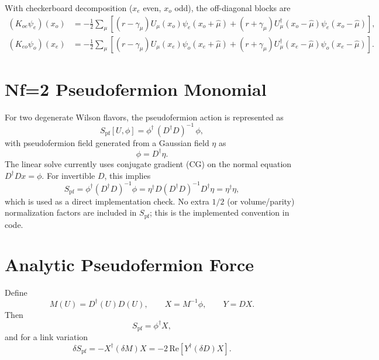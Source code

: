 \documentclass[11pt]{article}
\begin{document}
With checkerboard decomposition ($x_e$ even, $x_o$ odd), the off-diagonal blocks are
\begin{align}
(K_{oe}\psi_e)(x_o)
&=
-\frac{1}{2}\sum_\mu\left[(r-\gamma_\mu)U_\mu(x_o)\psi_e(x_o+\hat\mu)
+(r+\gamma_\mu)U_\mu^\dagger(x_o-\hat\mu)\psi_e(x_o-\hat\mu)\right],\\
(K_{eo}\psi_o)(x_e)
&=
-\frac{1}{2}\sum_\mu\left[(r-\gamma_\mu)U_\mu(x_e)\psi_o(x_e+\hat\mu)
+(r+\gamma_\mu)U_\mu^\dagger(x_e-\hat\mu)\psi_o(x_e-\hat\mu)\right].
\end{align}

\section{Nf=2 Pseudofermion Monomial}
For two degenerate Wilson flavors, the pseudofermion action is represented as
\begin{equation}
S_{\mathrm{pf}}[U,\phi] = \phi^\dagger\,(D^\dagger D)^{-1}\,\phi,
\end{equation}
with pseudofermion field generated from a Gaussian field $\eta$ as
\begin{equation}
\phi = D^\dagger \eta.
\end{equation}
The linear solve currently uses conjugate gradient (CG) on the normal equation
$D^\dagger D x = \phi$.
For invertible $D$, this implies
\begin{equation}
S_{\mathrm{pf}} = \phi^\dagger (D^\dagger D)^{-1}\phi
= \eta^\dagger D (D^\dagger D)^{-1} D^\dagger \eta
= \eta^\dagger \eta,
\end{equation}
which is used as a direct implementation check.
No extra $1/2$ (or volume/parity) normalization factors are included in
$S_{\mathrm{pf}}$; this is the implemented convention in code.

\section{Analytic Pseudofermion Force}
Define
\begin{equation}
M(U)=D^\dagger(U)D(U), \qquad
X = M^{-1}\phi, \qquad
Y = D X.
\end{equation}
Then
\begin{equation}
S_{\mathrm{pf}} = \phi^\dagger X,
\end{equation}
and for a link variation
\begin{equation}
\delta S_{\mathrm{pf}}
= - X^\dagger (\delta M) X
= -2\,\mathrm{Re}\!\left[Y^\dagger (\delta D) X\right].
\end{equation}
\end{document}
